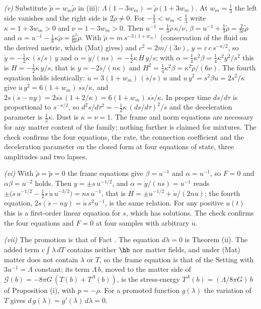 \emph{(v)} Substitute $\tilde p = w_{m}\tilde\rho$ in (iii): $\Lambda(1 - 3w_{m}) = \tilde\rho(1 + 3w_{m})$. At $w_{m} = \tfrac13$ the left side vanishes and the right side is $2\tilde\rho \neq 0$. For $-\tfrac13 < w_{m} < \tfrac13$ write $\kappa = 1 + 3w_{m} > 0$ and $\nu = 1 - 3w_{m} > 0$. Then $u^{-1} = \tfrac13\tilde\rho\,\kappa/\nu$, $\beta = u^{-1} + \tfrac13\tilde\rho = \tfrac{2}{3\nu}\tilde\rho$ and $\alpha = u^{-1} - \tfrac16\kappa\tilde\rho = \tfrac{\kappa^{2}}{6\nu}\tilde\rho$. With $\tilde\rho = m\,s^{-3(1 + w_{m})}$ (conservation of the fluid on the derived metric, which (Mat) gives) and $c^{2} = 2m/(3\nu)$, $y = \varepsilon\,c\,s^{-\kappa/2}$, so $\dot y = -\tfrac12\kappa\,(\dot s/s)\,y$ and $\alpha = \dot y/(ns) = -\tfrac12\kappa\,H\,y/s$; with $\alpha = \tfrac14\kappa^{2}\beta = \tfrac14\kappa^{2}y^{2}/s^{2}$ this is $H = -\tfrac12\kappa\,y/s$, that is $y = -2\dot s/(n\kappa)$ and $H^{2} = \tfrac14\kappa^{2}\beta = \kappa^{2}\tilde\rho/(6\nu)$. The fourth equation holds identically: $\dot u = 3(1 + w_{m})\,(\dot s/s)\,u$ and $u\,y^{2} = s^{2}\beta u = 2s^{2}/\kappa$ give $\dot u\,y^{2} = 6(1 + w_{m})\,s\dot s/\kappa$, and $2s(\dot s - ny) = 2s\dot s\,(1 + 2/\kappa) = 6(1 + w_{m})\,s\dot s/\kappa$. In proper time $ds/d\tau$ is proportional to $s^{-\kappa/2}$, so $d^{2}s/d\tau^{2} = -\tfrac12\kappa\,(ds/d\tau)^{2}/s$ and the deceleration parameter is $\tfrac12\kappa$. Dust is $\kappa = \nu = 1$. The frame and norm equations are necessary for any matter content of the family; nothing further is claimed for mixtures. The check confirms the four equations, the rate, the connection coefficient and the deceleration parameter on the closed form at four equations of state, three amplitudes and two lapses.

\emph{(vi)} With $\tilde\rho = \tilde p = 0$ the frame equations give $\beta = u^{-1}$ and $\alpha = u^{-1}$, so $F = 0$ and $\alpha\beta = u^{-2}$ holds. Then $y = \pm s\,u^{-1/2}$, and $\alpha = \dot y/(ns) = u^{-1}$ reads $\pm\bigl(\dot s\,u^{-1/2} - \tfrac12 s\,\dot u\,u^{-3/2}\bigr) = n s\,u^{-1}$, that is $H = \pm u^{-1/2} + \dot u/(2nu)$; the fourth equation, $2s(\dot s - n y) = \dot u\,s^{2}u^{-1}$, is the same relation. For any positive $u(t)$ this is a first-order linear equation for $s$, which has solutions. The check confirms the four equations and $F = 0$ at four samples with arbitrary $\dot u$.

\emph{(vii)} The promotion is that of Fact . The equation $d\lambda = 0$ is Theorem (ii). The added term $c\int\lambda\,dT$ contains neither $\hb$ nor matter fields, and under (Mat) matter does not contain $\lambda$ or $T$, so the frame equation is that of the Setting with $3u^{-1} = \Lambda$ constant; its term $\Lambda\,b$, moved to the matter side of $\mathcal{G}(b) = -8\pi G\,(T(b) + T^{\Lambda}(b))$, is the stress-energy $T^{\Lambda}(b) = (\Lambda/8\pi G)\,b$ of Proposition (i), with $p = -\rho$. For a promoted function $g(\lambda)$ the variation of $T$ gives $d\,g(\lambda) = g'(\lambda)\,d\lambda = 0$.


